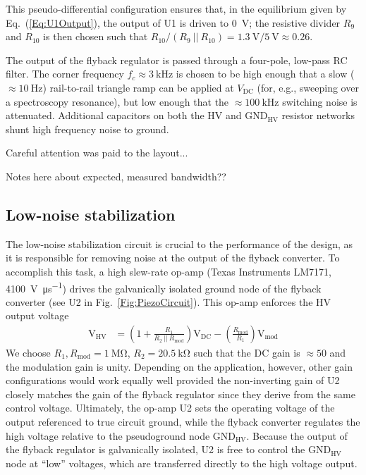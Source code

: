 \documentclass[aip,rsi,reprint]{revtex4-1} %
\begin{document}
This pseudo-differential configuration ensures that, in the equilibrium given by Eq.~(\ref{Eq:U1Output}), the output of U1 is driven to \SI{0}{\volt}; the resistive divider $R_9$ and $R_{10}$ is then chosen such that $R_{10}/(R_9~||~R_{10}) = \SI{1.3}{\volt}/\SI{5}{\volt} \approx \num{0.26}$.

The output of the flyback regulator is passed through a four-pole, low-pass RC filter.
The corner frequency $f_c \approx \SI{3}{\kilo\hertz}$ is chosen to be high enough that a slow ($\approx \SI{10}{\hertz}$) rail-to-rail triangle ramp can be applied at $V_\text{DC}$ (for, e.g., sweeping over a spectroscopy resonance), but low enough that the $\approx \SI{100}{\kilo\hertz}$ switching noise is attenuated.
Additional capacitors on both the HV and $\text{GND}_{\text{HV}}$ resistor networks shunt high frequency noise to ground.

Careful attention was paid to the layout...

Notes here about expected, measured bandwidth??


\subsection{Low-noise stabilization}
\label{Sec:LowNoiseStabilization}

The low-noise stabilization circuit is crucial to the performance of the design, as it is responsible for removing noise at the output of the flyback converter.
To accomplish this task, a high slew-rate op-amp (Texas Instruments LM7171, \SI{4100}{\volt\per\micro\second}) drives the galvanically isolated ground node of the flyback converter (see U2 in Fig.~\ref{Fig:PiezoCircuit}).
This op-amp enforces the HV output voltage
\begin{align}
\text{V}_\text{HV} &= \left(1 + \frac{R_1}{R_2~||~R_\text{mod}}\right) \text{V}_\text{DC} -
\left(\frac{R_\text{mod}}{R_1}\right) \text{V}_\text{mod}
\end{align}
We choose $R_1, R_\text{mod} = \SI{1}{\mega\ohm}$, $R_2 = \SI{20.5}{\kilo\ohm}$ such that the DC gain is $\approx 50$ and the modulation gain is unity.
Depending on the application, however, other gain configurations would work equally well provided the non-inverting gain of U2 closely matches the gain of the flyback regulator since they derive from the same control voltage.
Ultimately, the op-amp U2 sets the operating voltage of the output referenced to true circuit ground, while the flyback converter regulates the high voltage relative to the pseudoground node $\text{GND}_\text{HV}$.
Because the output of the flyback regulator is galvanically isolated, U2 is free to control the $\text{GND}_\text{HV}$ node at ``low'' voltages, which are transferred directly to the high voltage output.
\end{document}
